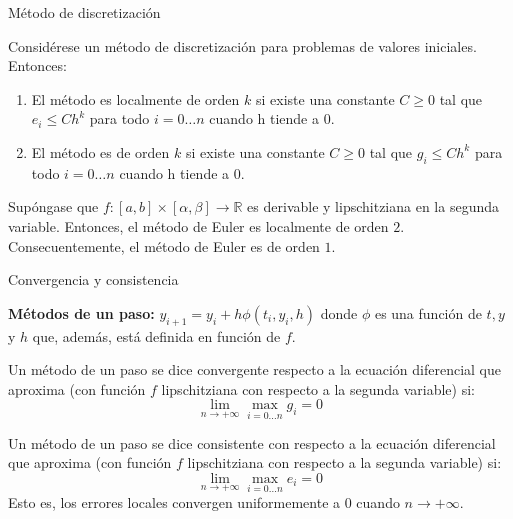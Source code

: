 		\begin{frame}{Método de discretización}
			\fontsize{11}{11}\selectfont
			\begin{definition}
				Considérese un método de discretización para problemas de valores iniciales. Entonces:
				\begin{enumerate}
					\item El método es localmente de orden $k$ si existe una constante $C \ge 0$ tal que $e_i \le C h^k$ para todo $i = 0 \ldots n$ cuando h tiende a 0.
					\item El método es de orden $k$ si existe una constante $C \ge 0$ tal que $g_i \le C h^k$ para todo $i = 0 \ldots n$ cuando h tiende a 0.
				\end{enumerate}
			\end{definition}
			
			\begin{theorem} \label{theorem:euler:error}
				Supóngase que $f: [a,b] \times [\alpha, \beta] \rightarrow \mathbb{R}$ es derivable y lipschitziana en la segunda variable. Entonces, el método de Euler es localmente de orden $2$. Consecuentemente, el método de Euler es de orden $1$.
			\end{theorem}	
		\end{frame}
			
		\begin{frame}{Convergencia y consistencia}		
			\fontsize{8}{8}\selectfont
			
			\textbf{Métodos de un paso:} $y_{i+1}=y_i + h \phi(t_i,y_i,h)$ donde $\phi$ es una función de $t, y$ y $h$ que, además, está definida en función de $f$.
			
			\begin{definition}
			Un método de un paso se dice convergente respecto a la ecuación diferencial que aproxima (con función $f$ lipschitziana con respecto a la segunda variable) si:
			$$ \lim_{n \rightarrow +\infty} \max_{i = 0 \ldots n} g_i = 0 $$
			\end{definition}
	
		    \begin{definition}
		    	Un método de un paso se dice consistente con respecto a la ecuación diferencial que aproxima (con función $f$ lipschitziana con respecto a la segunda variable) si:
		    	$$ \lim_{n \rightarrow +\infty} \max_{i = 0 \ldots n} e_i = 0 $$
		    	Esto es, los errores locales convergen uniformemente a 0 cuando $n \rightarrow +\infty$.
		    \end{definition}
		\end{frame}	
			
